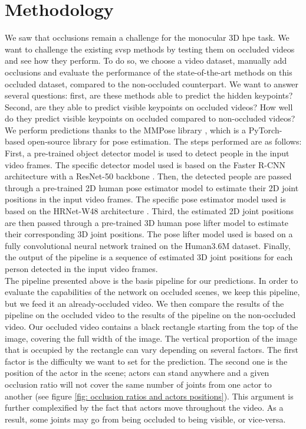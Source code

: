\documentclass[runningheads]{llncs}
\begin{document}
\section{Methodology}
\label{sec: methodology}
We saw that occlusions remain a challenge for the monocular 3D \ac{hpe} task. We want to challenge the existing \ac{svsp} methods by testing them on occluded videos and see how they perform. To do so, we choose a video dataset, manually add occlusions and evaluate the performance of the state-of-the-art methods on this occluded dataset, compared to the non-occluded counterpart. We want to answer several questions: first, are these methods able to predict the hidden keypoints? Second, are they able to predict visible keypoints on occluded videos? How well do they predict visible keypoints on occluded compared to non-occluded videos? \\
We perform predictions thanks to the MMPose library \cite{mmpose}, which is a PyTorch-based open-source library for pose estimation. The steps performed are as follows: First, a pre-trained object detector model is used to detect people in the input video frames. The specific detector model used is based on the Faster R-CNN architecture \cite{faster RCNN} with a ResNet-50 backbone \cite{resnet}. Then, the detected people are passed through a pre-trained 2D human pose estimator model to estimate their 2D joint positions in the input video frames. The specific pose estimator model used is based on the HRNet-W48 architecture \cite{hrnet}. Third, the estimated 2D joint positions are then passed through a pre-trained 3D human pose lifter model to estimate their corresponding 3D joint positions. The pose lifter model used is based on a fully convolutional neural network trained on the Human3.6M dataset. Finally, the output of the pipeline is a sequence of estimated 3D joint positions for each person detected in the input video frames. \\
The pipeline presented above is the basis pipeline for our predictions. In order to evaluate the capabilities of the network on occluded scenes, we keep this pipeline, but we feed it an already-occluded video. We then compare the results of the pipeline on the occluded video to the results of the pipeline on the non-occluded video. Our occluded video contains a black rectangle starting from the top of the image, covering the full width of the image. The vertical proportion of the image that is occupied by the rectangle can vary depending on several factors. The first factor is the difficulty we want to set for the prediction. The second one is the position of the actor in the scene; actors can stand anywhere and a given occlusion ratio will not cover the same number of joints from one actor to another (see figure \ref{fig: occlusion ratios and actors positions}). This argument is further complexified by the fact that actors move throughout the video. As a result, some joints may go from being occluded to being visible, or vice-versa.
\end{document}

